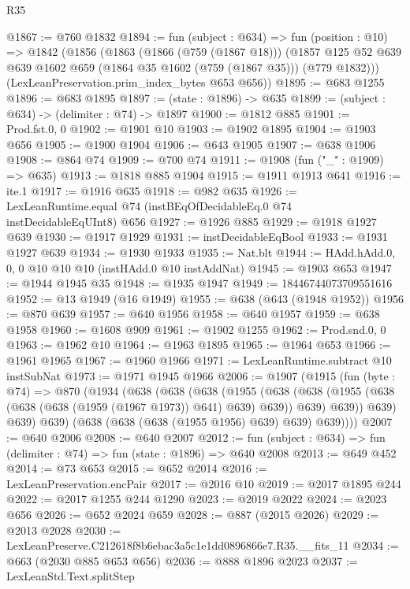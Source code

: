\begin{lexlean}{R35}
\begin{coremodule}
@1867 := @760 @1832
@1894 := fun (subject : @634) =>
  fun (position : @10) =>
  @1842
    (@1856
      (@1863
        (@1866 (@759 (@1867 @18)))
        (@1857 @125 @52 @639 @639 @1602 @659 (@1864 @35 @1602 (@759 (@1867 @35))) (@779 @1832)))
      (LexLeanPreservation.prim_index_bytes @653 @656))
@1895 := @683 @1255
@1896 := @683 @1895
@1897 := (state : @1896) -> @635
@1899 := (subject : @634) -> (delimiter : @74) -> @1897
@1900 := @1812 @885
@1901 := Prod.fst.{0, 0}
@1902 := @1901 @10
@1903 := @1902 @1895
@1904 := @1903 @656
@1905 := @1900 @1904
@1906 := @643 @1905
@1907 := @638 @1906
@1908 := @864 @74
@1909 := @700 @74
@1911 := @1908 (fun ("_" : @1909) => @635)
@1913 := @1818 @885 @1904
@1915 := @1911 @1913 @641
@1916 := ite.{1}
@1917 := @1916 @635
@1918 := @982 @635
@1926 := LexLeanRuntime.equal @74 (instBEqOfDecidableEq.{0} @74 instDecidableEqUInt8) @656
@1927 := @1926 @885
@1929 := @1918 @1927 @639
@1930 := @1917 @1929
@1931 := instDecidableEqBool
@1933 := @1931 @1927 @639
@1934 := @1930 @1933
@1935 := Nat.blt
@1944 := HAdd.hAdd.{0, 0, 0} @10 @10 @10 (instHAdd.{0} @10 instAddNat)
@1945 := @1903 @653
@1947 := @1944 @1945 @35
@1948 := @1935 @1947
@1949 := 18446744073709551616
@1952 := @13 @1949 (@16 @1949)
@1955 := @638 (@643 (@1948 @1952))
@1956 := @870 @639
@1957 := @640 @1956
@1958 := @640 @1957
@1959 := @638 @1958
@1960 := @1608 @909
@1961 := @1902 @1255
@1962 := Prod.snd.{0, 0}
@1963 := @1962 @10
@1964 := @1963 @1895
@1965 := @1964 @653
@1966 := @1961 @1965
@1967 := @1960 @1966
@1971 := LexLeanRuntime.subtract @10 instSubNat
@1973 := @1971 @1945 @1966
@2006 := @1907
    (@1915
      (fun (byte : @74) =>
      @870
        (@1934
          (@638
            (@638
              (@638
                (@1955
                  (@638
                    (@638 (@1955 (@638 (@638 (@638 (@1959 (@1967 @1973)) @641) @639) @639)) @639)
                    @639))
                @639)
              @639)
            @639)
          (@638 (@638 (@638 (@1955 @1956) @639) @639) @639))))
@2007 := @640 @2006
@2008 := @640 @2007
@2012 := fun (subject : @634) => fun (delimiter : @74) => fun (state : @1896) => @640 @2008
@2013 := @649 @452
@2014 := @73 @653
@2015 := @652 @2014
@2016 := LexLeanPreservation.encPair
@2017 := @2016 @10
@2019 := @2017 @1895 @244
@2022 := @2017 @1255 @244 @1290
@2023 := @2019 @2022
@2024 := @2023 @656
@2026 := @652 @2024 @659
@2028 := @887 (@2015 @2026)
@2029 := @2013 @2028
@2030 := LexLeanPreserve.C212618f8b6ebac3a5c1e1dd0896866e7.R35.__fits_11
@2034 := @663 (@2030 @885 @653 @656)
@2036 := @888 @1896 @2023
@2037 := LexLeanStd.Text.splitStep

\end{coremodule}
\end{lexlean}
